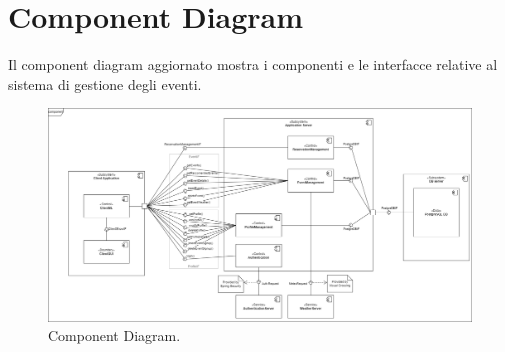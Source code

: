 \section{Component Diagram} 
Il component diagram aggiornato mostra i componenti e le interfacce relative al sistema di gestione degli eventi.
\begin{figure}[h!]
	\centering
	\includegraphics[width=1\textwidth]{Iterazione 2/diagrams/Component.drawio.png}
	\caption{Component Diagram.}
	\label{fig:ComponentDiagramIt2}
\end{figure}